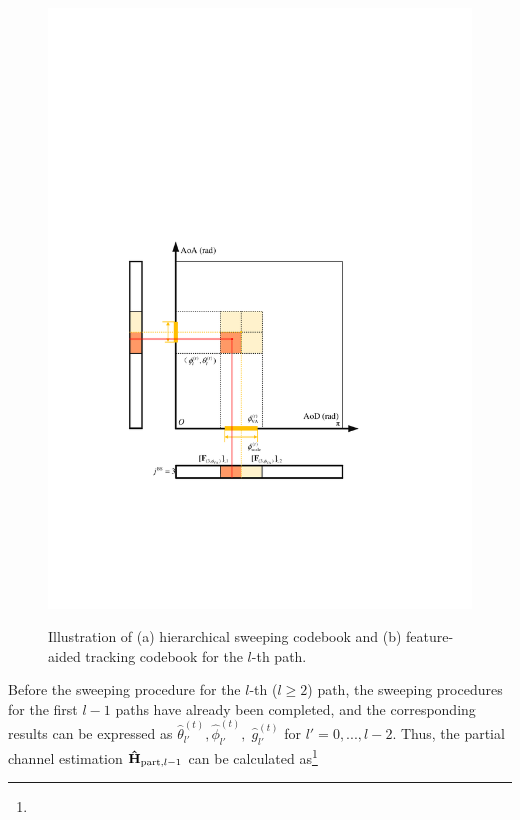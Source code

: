\documentclass[journal,12pt,onecolumn,draftclsnofoot,]{IEEEtran}
\begin{document}
\begin{figure}
{\includegraphics[scale=0.68,trim=0 0 0 0,clip]{4-2.pdf}
}
\caption{Illustration of (a) hierarchical sweeping codebook and (b) feature-aided tracking codebook for the $l$-th path.}
\label{d}%
\vspace{-6mm}
\end{figure}

{} 
Before the sweeping procedure for the $l$-th ($l \ge 2$) path, the sweeping procedures for the first $l-1$ paths have already been completed, and the corresponding results can be expressed as $\hat \theta _{l'}^{(t )},\hat \phi _{l'}^{(t )},\;\hat g_{l'}^{(t )}$ for $l' = 0, ...,l - 2$. 
Thus, the partial channel estimation ${{\bf{\hat H}}}_{{\rm{part}},l-1}$ can be calculated as\footnote{{}}
\end{document}

